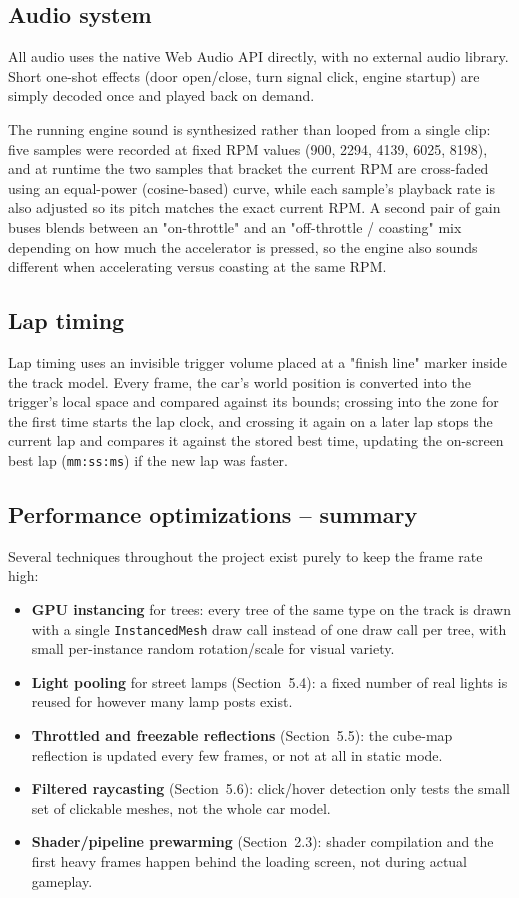 \documentclass[11pt]{article}
\begin{document}
\subsection{Audio system}
All audio uses the native Web Audio API directly, with no external audio
library. Short one-shot effects (door open/close, turn signal click, engine
startup) are simply decoded once and played back on demand.

The running engine sound is synthesized rather than looped from a single
clip: five samples were recorded at fixed RPM values (900, 2294, 4139,
6025, 8198), and at runtime the two samples that bracket the current RPM
are cross-faded using an equal-power (cosine-based) curve, while each
sample's playback rate is also adjusted so its pitch matches the exact
current RPM. A second pair of gain buses blends between an "on-throttle"
and an "off-throttle / coasting" mix depending on how much the accelerator
is pressed, so the engine also sounds different when accelerating versus
coasting at the same RPM.

\subsection{Lap timing}
Lap timing uses an invisible trigger volume placed at a "finish line"
marker inside the track model. Every frame, the car's world position is
converted into the trigger's local space and compared against its bounds;
crossing into the zone for the first time starts the lap clock, and
crossing it again on a later lap stops the current lap and compares it
against the stored best time, updating the on-screen best lap
(\texttt{mm:ss:ms}) if the new lap was faster.

\subsection{Performance optimizations -- summary}
Several techniques throughout the project exist purely to keep the frame
rate high:
\begin{itemize}
    \item \textbf{GPU instancing} for trees: every tree of the same type on
    the track is drawn with a single \texttt{InstancedMesh} draw call
    instead of one draw call per tree, with small per-instance random
    rotation/scale for visual variety.
    \item \textbf{Light pooling} for street lamps (Section~5.4): a fixed
    number of real lights is reused for however many lamp posts exist.
    \item \textbf{Throttled and freezable reflections} (Section~5.5): the
    cube-map reflection is updated every few frames, or not at all in
    static mode.
    \item \textbf{Filtered raycasting} (Section~5.6): click/hover detection
    only tests the small set of clickable meshes, not the whole car model.
    \item \textbf{Shader/pipeline prewarming} (Section~2.3): shader
    compilation and the first heavy frames happen behind the loading
    screen, not during actual gameplay.
\end{itemize}
\end{document}

